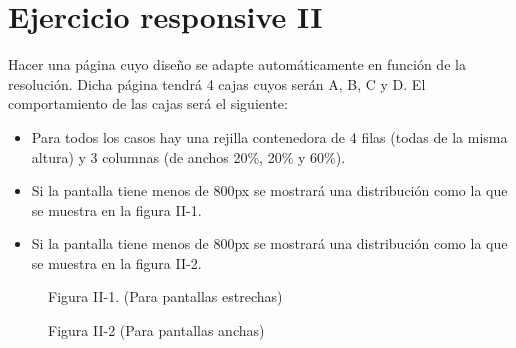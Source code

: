 \documentclass[letterpaper,10pt,spanish]{sphinxmanual}
\begin{document}
\begin{sphinxVerbatim}[commandchars=\\\{\}]
         
         
\end{sphinxVerbatim}


\section{Ejercicio responsive II}
\label{\detokenize{tema3:ejercicio-responsive-ii}}
Hacer una página cuyo diseño se adapte automáticamente en función de la resolución. Dicha página tendrá 4 cajas cuyos  serán A, B,  C y D. El comportamiento de las cajas será el siguiente:
\begin{itemize}
\item {} 
Para todos los casos hay una rejilla contenedora de 4 filas (todas de la misma altura) y 3 columnas (de anchos 20\%, 20\% y 60\%).

\item {} 
Si la pantalla tiene menos de 800px se mostrará una distribución como la que se muestra en la figura II-1.

\item {} 
Si la pantalla tiene menos de 800px se mostrará una distribución como la que se muestra en la figura II-2.

\end{itemize}

\begin{figure}[htbp]
\centering
\capstart

\noindent{}
\caption{Figura II-1. (Para pantallas estrechas)}\label{\detokenize{tema3:id25}}\end{figure}

\begin{figure}[htbp]
\centering
\capstart

\noindent{}
\caption{Figura II-2 (Para pantallas anchas)}\label{\detokenize{tema3:id26}}\end{figure}
\end{document}
